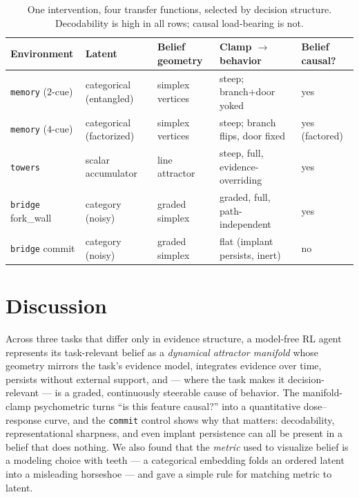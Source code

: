 \documentclass[11pt]{article}
\newcommand{\code}[1]{\texttt{#1}}
\begin{document}
\begin{table}[tbp]
\centering\small
\begin{tabular}{@{}lllll@{}}
\toprule
Environment & Latent & Belief geometry & Clamp $\rightarrow$ behavior & Belief causal? \\
\midrule
\code{memory} ($2$-cue)  & categorical (entangled)  & simplex vertices & steep; branch+door yoked & yes \\
\code{memory} ($4$-cue)  & categorical (factorized) & simplex vertices & steep; branch flips, door fixed & yes (factored) \\
\code{towers}            & scalar accumulator       & line attractor   & steep, full, evidence-overriding & yes \\
\code{bridge} fork\_wall & category (noisy)         & graded simplex   & graded, full, path-independent & yes \\
\code{bridge} commit     & category (noisy)         & graded simplex   & flat (implant persists, inert) & no \\
\bottomrule
\end{tabular}
\caption{One intervention, four transfer functions, selected by decision
structure. Decodability is high in all rows; causal load-bearing is not.}
\label{tab:summary}
\end{table}

\section{Discussion}

Across three tasks that differ only in evidence structure, a model-free RL agent
represents its task-relevant belief as a \emph{dynamical attractor manifold} whose
geometry mirrors the task's evidence model, integrates evidence over time, persists
without external support, and --- where the task makes it decision-relevant --- is a
graded, continuously steerable cause of behavior. The manifold-clamp psychometric
turns ``is this feature causal?'' into a quantitative dose--response curve, and the
\code{commit} control shows why that matters: decodability, representational
sharpness, and even implant persistence can all be present in a belief that does
nothing. We also found that the \emph{metric} used to visualize belief is a modeling
choice with teeth --- a categorical embedding folds an ordered latent into a
misleading horseshoe --- and gave a simple rule for matching metric to latent.
\end{document}
